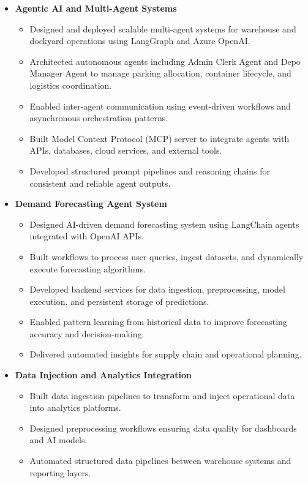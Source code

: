 \documentclass[letterpaper,10pt]{article}
\begin{document}
\begin{itemize}

\item \textbf{Agentic AI and Multi-Agent Systems}
\begin{itemize}
    \item Designed and deployed scalable multi-agent systems for warehouse and dockyard operations using LangGraph and Azure OpenAI.
    \item Architected autonomous agents including Admin Clerk Agent and Depo Manager Agent to manage parking allocation, container lifecycle, and logistics coordination.
    \item Enabled inter-agent communication using event-driven workflows and asynchronous orchestration patterns.
    \item Built Model Context Protocol (MCP) server to integrate agents with APIs, databases, cloud services, and external tools.
    \item Developed structured prompt pipelines and reasoning chains for consistent and reliable agent outputs.
\end{itemize}

\item \textbf{Demand Forecasting Agent System}
\begin{itemize}
    \item Designed AI-driven demand forecasting system using LangChain agents integrated with OpenAI APIs.
    \item Built workflows to process user queries, ingest datasets, and dynamically execute forecasting algorithms.
    \item Developed backend services for data ingestion, preprocessing, model execution, and persistent storage of predictions.
    \item Enabled pattern learning from historical data to improve forecasting accuracy and decision-making.
    \item Delivered automated insights for supply chain and operational planning.
\end{itemize}

\item \textbf{Data Injection and Analytics Integration}
\begin{itemize}
    \item Built data ingestion pipelines to transform and inject operational data into analytics platforms.
    \item Designed preprocessing workflows ensuring data quality for dashboards and AI models.
    \item Automated structured data pipelines between warehouse systems and reporting layers.
\end{itemize}


\end{itemize}
\end{document}
